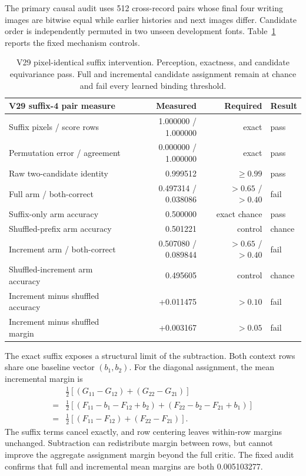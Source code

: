 \documentclass[11pt]{article}
\begin{document}
The primary causal audit uses 512 cross-record pairs whose final four writing
images are bitwise equal while earlier histories and next images differ.
Candidate order is independently permuted in two unseen development fonts.
Table~\ref{tab:v29pairs} reports the fixed mechanism controls.

\begin{table}[h!]
\centering
\small
\begin{tabular}{lrrl}
\toprule
V29 suffix-4 pair measure & Measured & Required & Result \\
\midrule
Suffix pixels / score rows & 1.000000 / 1.000000 & exact & pass \\
Permutation error / agreement & 0.000000 / 1.000000 & exact & pass \\
Raw two-candidate identity & 0.999512 & $\geq0.99$ & pass \\
Full arm / both-correct & 0.497314 / 0.038086 & $>0.65$ / $>0.40$ & fail \\
Suffix-only arm accuracy & 0.500000 & exact chance & pass \\
Shuffled-prefix arm accuracy & 0.501221 & control & chance \\
Increment arm / both-correct & 0.507080 / 0.089844 & $>0.65$ / $>0.40$ & fail \\
Shuffled-increment arm accuracy & 0.495605 & control & chance \\
Increment minus shuffled accuracy & +0.011475 & $>0.10$ & fail \\
Increment minus shuffled margin & +0.003167 & $>0.05$ & fail \\
\bottomrule
\end{tabular}
\caption{V29 pixel-identical suffix intervention. Perception, exactness, and
candidate equivariance pass. Full and incremental candidate assignment remain
at chance and fail every learned binding threshold.}
\label{tab:v29pairs}
\end{table}

The exact suffix exposes a structural limit of the subtraction. Both context
rows share one baseline vector $(b_1,b_2)$. For the diagonal assignment, the
mean incremental margin is
\[
\begin{aligned}
&\tfrac12[(G_{11}-G_{12})+(G_{22}-G_{21})]\\
={}&\tfrac12[(F_{11}-b_1-F_{12}+b_2)
 +(F_{22}-b_2-F_{21}+b_1)]\\
={}&\tfrac12[(F_{11}-F_{12})+(F_{22}-F_{21})].
\end{aligned}
\]
The suffix terms cancel exactly, and row centering leaves within-row margins
unchanged. Subtraction can redistribute margin between rows, but cannot improve
the aggregate assignment margin beyond the full critic. The fixed audit
confirms that full and incremental mean margins are both 0.005103277.
\end{document}
